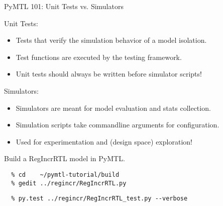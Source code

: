 \begin{frame}{PyMTL 101: Unit Tests vs. Simulators}

Unit Tests: 
\begin{itemize}
  \item Tests that verify the simulation behavior of a model isolation.
  \item Test functions are executed by the  testing framework.
  \item Unit tests should always be written before simulator scripts!
\end{itemize}

\vspace{0.2in}

Simulators: 
\begin{itemize}
  \item Simulators are meant for model evaluation and stats collection.
  \item Simulation scripts take commandline arguments for configuration.
  \item Used for experimentation and (design space) exploration!
\end{itemize}

\end{frame}

\begin{task}\begin{frame}[fragile]{Build a RegIncrRTL model in PyMTL.}

\begin{verbatim}
  % cd    ~/pymtl-tutorial/build
  % gedit ../regincr/RegIncrRTL.py
\end{verbatim}

\begin{verbatim}
  % py.test ../regincr/RegIncrRTL_test.py --verbose
\end{verbatim}

\end{frame}
\end{task}

